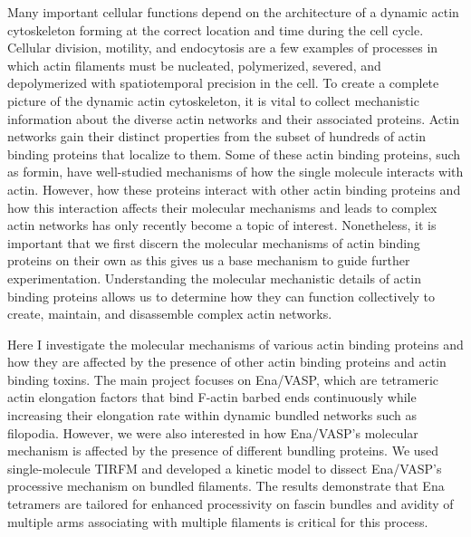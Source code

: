 \abstract
Many important cellular functions depend on the architecture of a dynamic actin cytoskeleton forming at the correct location and time during the cell cycle. Cellular division, motility, and endocytosis are a few examples of processes in which actin filaments must be nucleated, polymerized, severed, and depolymerized with spatiotemporal precision in the cell. To create a complete picture of the dynamic actin cytoskeleton, it is vital to collect mechanistic information about the diverse actin networks and their associated proteins. Actin networks gain their distinct properties from the subset of hundreds of actin binding proteins that localize to them. Some of these actin binding proteins, such as formin, have well-studied mechanisms of how the single molecule interacts with actin. However, how these proteins interact with other actin binding proteins and how this interaction affects their molecular mechanisms and leads to complex actin networks has only recently become a topic of interest. Nonetheless, it is important that we first discern the molecular mechanisms of actin binding proteins on their own as this gives us a base mechanism to guide further experimentation. Understanding the molecular mechanistic details of actin binding proteins allows us to determine how they can function collectively to create, maintain, and disassemble complex actin networks. 

Here I investigate the molecular mechanisms of various actin binding proteins and how they are affected by the presence of other actin binding proteins and actin binding toxins. The main project focuses on Ena/VASP, which are tetrameric actin elongation factors that bind F-actin barbed ends continuously while increasing their elongation rate within dynamic bundled networks such as filopodia. However, we were also interested in how Ena/VASP's molecular mechanism is affected by the presence of different bundling proteins. We used single-molecule TIRFM and developed a kinetic model to dissect Ena/VASP’s processive mechanism on bundled filaments. The results demonstrate that Ena tetramers are tailored for enhanced processivity on fascin bundles and avidity of multiple arms associating with multiple filaments is critical for this process. 

